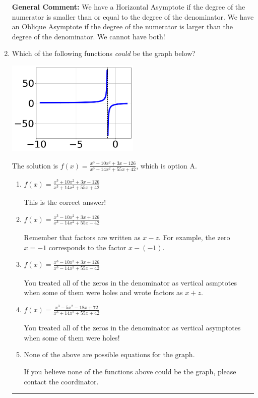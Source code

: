 \documentclass{extbook}[14pt]
\newcommand{\litem}[1]{\item #1

\rule{\textwidth}{0.4pt}}
\begin{document}
\begin{enumerate}
{\textbf{General Comment:} We have a Horizontal Asymptote if the degree of the numerator is smaller than or equal to the degree of the denominator. We have an Oblique Asymptote if the degree of the numerator is larger than the degree of the denominator. We cannot have both!
}
\litem{
Which of the following functions \textit{could} be the graph below?

\begin{center}
    \includegraphics[width=0.5\textwidth]{../Figures/identifyGraphOfRationalFunctionCopyA.png}
\end{center}




The solution is \( f(x)=\frac{x^{3} +10 x^{2} +3 x -126}{x^{3} +14 x^{2} +55 x + 42} \), which is option A.\begin{enumerate}[label=\Alph*.]
\item \( f(x)=\frac{x^{3} +10 x^{2} +3 x -126}{x^{3} +14 x^{2} +55 x + 42} \)

This is the correct answer!
\item \( f(x)=\frac{x^{3} -10 x^{2} +3 x + 126}{x^{3} -14 x^{2} +55 x -42} \)

Remember that factors are written as $x-z$. For example, the zero $x=-1$ corresponds to the factor $x-(-1)$.
\item \( f(x)=\frac{x^{3} -10 x^{2} +3 x + 126}{x^{3} -14 x^{2} +55 x -42} \)

You treated all of the zeros in the denominator as vertical asmptotes when some of them were holes and wrote factors as $x+z$.
\item \( f(x)=\frac{x^{3} -5 x^{2} -18 x + 72}{x^{3} +14 x^{2} +55 x + 42} \)

You treated all of the zeros in the denominator as vertical asymptotes when some of them were holes!
\item \( \text{None of the above are possible equations for the graph.} \)

If you believe none of the functions above could be the graph, please contact the coordinator.
\end{enumerate}

}
\end{enumerate}
\end{document}
